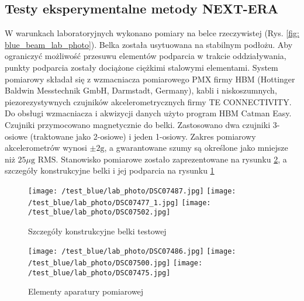 \subsection{Testy eksperymentalne metody NEXT-ERA} \label{sect: next_era_lab_test}
W warunkach laboratoryjnych wykonano pomiary na belce rzeczywistej (Rys. \ref{fig: blue_beam_lab_photo}). Belka została usytuowana na stabilnym podłożu. Aby ograniczyć możliwość przesuwu elementów podparcia w trakcie oddziaływania, punkty podparcia zostały dociążone ciężkimi stalowymi elementami. System pomiarowy składał się z wzmacniacza pomiarowego PMX firmy HBM (Hottinger Baldwin Messtechnik GmbH, Darmstadt, Germany), kabli i niskoszumnych, piezorezystywnych czujników akcelerometrycznych firmy TE CONNECTIVITY. Do obsługi wzmacniacza i akwizycji danych użyto program HBM Catman Easy. Czujniki przymocowano magnetycznie do belki. Zastosowano dwa czujniki 3-osiowe (traktowane jako 2-osiowe) i jeden 1-osiowy. Zakres pomiarowy akcelerometrów wynosi $\pm 2 \text{g}$, a gwarantowane szumy są określone jako mniejsze niż $25\mu \text{g RMS}$. Stanowisko pomiarowe zostało zaprezentowane na rysunku \ref{fig: blue_beam_lab_photo_a}, a szczegóły konstrukcyjne belki i jej podparcia na rysunku \ref{fig: blue_beam_lab_photo_b}
\begin{figure}[h]
	\centering
	\texttt{[image: /test\_blue/lab\_photo/DSC07487.jpg]}
	\texttt{[image: /test\_blue/lab\_photo/DSC07477\_1.jpg]}
	\texttt{[image: /test\_blue/lab\_photo/DSC07502.jpg]}
	\captionsetup{justification=centering}
	\caption{Szczegóły konstrukcyjne belki testowej}
	\label{fig: blue_beam_lab_photo_b}
\end{figure}
\begin{figure}[h]
\centering	
	\texttt{[image: /test\_blue/lab\_photo/DSC07486.jpg]}
	\texttt{[image: /test\_blue/lab\_photo/DSC07500.jpg]}
	\texttt{[image: /test\_blue/lab\_photo/DSC07475.jpg]}
	\captionsetup{justification=centering}
	\caption{Elementy aparatury pomiarowej}
	\label{fig: blue_beam_lab_photo_a}
\end{figure}



